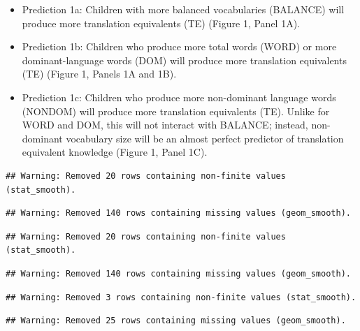 \documentclass[
  english,
  ,man,floatsintext]{apa6}
\providecommand{\tightlist}{%
  \setlength{\itemsep}{0pt}\setlength{\parskip}{0pt}}
\begin{document}
\begin{itemize}
\tightlist
\item
  Prediction 1a: Children with more balanced vocabularies (BALANCE) will produce more translation equivalents (TE) (Figure 1, Panel 1A).
\item
  Prediction 1b: Children who produce more total words (WORD) or more dominant-language words (DOM) will produce more translation equivalents (TE) (Figure 1, Panels 1A and 1B).\\
\item
  Prediction 1c: Children who produce more non-dominant language words (NONDOM) will produce more translation equivalents (TE). Unlike for WORD and DOM, this will not interact with BALANCE; instead, non-dominant vocabulary size will be an almost perfect predictor of translation equivalent knowledge (Figure 1, Panel 1C).
\end{itemize}

\begin{verbatim}
## Warning: Removed 20 rows containing non-finite values (stat_smooth).
\end{verbatim}

\begin{verbatim}
## Warning: Removed 140 rows containing missing values (geom_smooth).
\end{verbatim}

\begin{verbatim}
## Warning: Removed 20 rows containing non-finite values (stat_smooth).
\end{verbatim}

\begin{verbatim}
## Warning: Removed 140 rows containing missing values (geom_smooth).
\end{verbatim}

\begin{verbatim}
## Warning: Removed 3 rows containing non-finite values (stat_smooth).
\end{verbatim}

\begin{verbatim}
## Warning: Removed 25 rows containing missing values (geom_smooth).
\end{verbatim}
\end{document}
